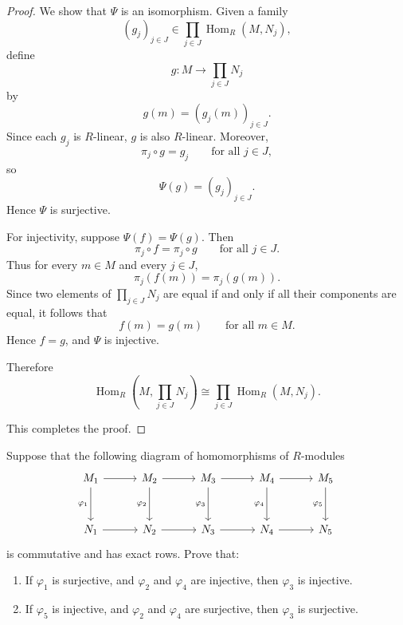\begin{proof}
    We show that $\Psi$ is an isomorphism. Given a family
    \[
        (g_j)_{j\in J}\in \prod_{j\in J}\operatorname{Hom}_R(M,N_j),
    \]
    define
    \[
        g:M\to \prod_{j\in J} N_j
    \]
    by
    \[
        g(m)=(g_j(m))_{j\in J}.
    \]
    Since each $g_j$ is $R$-linear, $g$ is also $R$-linear. Moreover,
    \[
        \pi_j\circ g=g_j
        \qquad\text{for all } j\in J,
    \]
    so
    \[
        \Psi(g)=(g_j)_{j\in J}.
    \]
    Hence $\Psi$ is surjective.

    For injectivity, suppose $\Psi(f)=\Psi(g)$. Then
    \[
        \pi_j\circ f=\pi_j\circ g
        \qquad\text{for all } j\in J.
    \]
    Thus for every $m\in M$ and every $j\in J$,
    \[
        \pi_j(f(m))=\pi_j(g(m)).
    \]
    Since two elements of $\prod_{j\in J} N_j$ are equal if and only if all their components are equal, it follows that
    \[
        f(m)=g(m)
        \qquad\text{for all } m\in M.
    \]
    Hence $f=g$, and $\Psi$ is injective.

    Therefore
    \[
        \operatorname{Hom}_R\!\left(M,\prod_{j\in J} N_j\right)
        \cong
        \prod_{j\in J}\operatorname{Hom}_R(M,N_j).
    \]

    This completes the proof.
\end{proof}

\begin{exercise}
    Suppose that the following diagram of homomorphisms of $R$-modules
    \[
        \begin{tikzcd}[column sep=3em, row sep=3em]
            M_1 \arrow[r] \arrow[d, "\varphi_1"'] &
            M_2 \arrow[r] \arrow[d, "\varphi_2"'] &
            M_3 \arrow[r] \arrow[d, "\varphi_3"'] &
            M_4 \arrow[r] \arrow[d, "\varphi_4"'] &
            M_5 \arrow[d, "\varphi_5"'] \\
            N_1 \arrow[r] &
            N_2 \arrow[r] &
            N_3 \arrow[r] &
            N_4 \arrow[r] &
            N_5
        \end{tikzcd}
    \]
    is commutative and has exact rows. Prove that:
    \begin{enumerate}
        \item If $\varphi_1$ is surjective, and $\varphi_2$ and $\varphi_4$ are injective, then $\varphi_3$ is injective.
        \item If $\varphi_5$ is injective, and $\varphi_2$ and $\varphi_4$ are surjective, then $\varphi_3$ is surjective.
    \end{enumerate}
\end{exercise}

